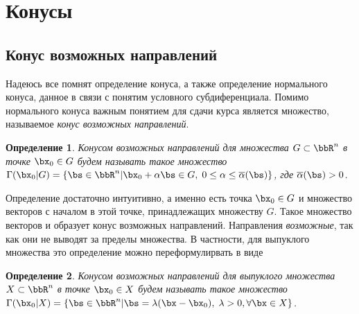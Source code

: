 \documentclass[12pt]{article}
\newtheorem{Def}{ Определение}
\begin{document}
%

\section{Конусы}
\subsection{Конус возможных направлений}
Надеюсь все помнят определение конуса, а также определение нормального конуса, данное в связи с понятим условного субдиференциала.
Помимо нормального конуса важным понятием для сдачи курса является множество, называемое \emph{конус возможных направлений}.
\begin{Def}
Конусом возможных направлений для множества $G \subset \bbR^n$ в точке $\bx_0 \in G$ будем называть такое множество $\Gamma(\bx_0 | G) = \{ \bs \in \bbR^n | \bx_0 + \alpha\bs \in G, \; 0 \leq \alpha \leq \overline{\alpha}(\bs) \}$, где $\overline{\alpha}(\bs) > 0$.
\end{Def}
Определение достаточно интуитивно, а именно есть точка $\bx_0 \in G$ и множество векторов с началом в этой точке, принадлежащих множеству $G$.
Такое множество векторов и образует конус возможных направлений.
Направления \emph{возможные}, так как они не выводят за пределы множества.
В частности, для выпуклого множества это определение можно переформулирвать в виде
\begin{Def}
Конусом возможных направлений для выпуклого множества $X \subset \bbR^n$ в точке $\bx_0 \in X$ будем называть такое множество $\Gamma(\bx_0 | X) = \{ \bs \in \bbR^n | \bs = \lambda (\bx - \bx_0), \; \lambda > 0, \forall \bx \in X \}$.
\end{Def}
\end{document}
